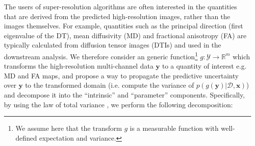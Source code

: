 The users of super-resolution algorithms are often interested in the quantities that are derived from the predicted high-resolution images, rather than the images themselves. For example, quantities such as the principal direction (first eigenvalue of the DT), mean diffusivity (MD) and fractional anisotropy (FA) are typically calculated from diffusion tensor images (DTIs) and used in the downstream analysis. We therefore consider an generic function\footnote{We assume here that the transform $g$ is a measurable function with well-defined expectation and variance.} $g:\mathcal{Y}\rightarrow\mathbb{R}^{m}$ which transforms the high-resolution multi-channel data $\mathbf{y}$ to a quantity of interest e.g. MD and FA maps, and propose a way to propagate the predictive uncertainty over $\mathbf{y}$ to the transformed domain (i.e. compute the variance of $p(g(\mathbf{y})|\mathcal{D}, \mathbf{x})$) and decompose it into the ``intrinsic'' and ``parameter'' components. Specifically, by using the law of total variance \cite{weiss2006course}, we perform the following decomposition:


